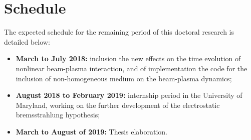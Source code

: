 \documentclass[12pt,a4paper,ruledheader]{report}
\begin{document}
\section{Schedule}
\label{sec:schedule}
The expected schedule for the remaining period of this doctoral
research is detailed below:
\begin{itemize}
\item \textbf{March to July 2018:} inclusion the new effects on
  the time evolution of nonlinear beam-plasma interaction, and of
  implementation the code for the inclusion of non-homogeneous
  medium on the beam-plasma dynamics;
\item \textbf{August 2018 to February 2019:} internship period in
  the University of Maryland, working on the further development
  of the electrostatic bremsstrahlung hypothesis;
\item \textbf{March to August of 2019:} Thesis elaboration.
\end{itemize}
\end{document}
